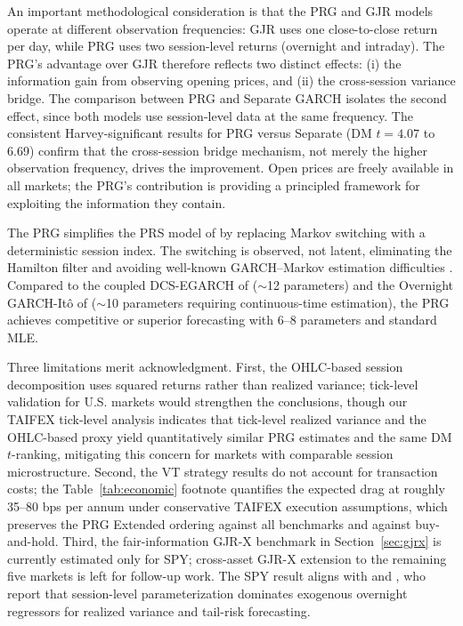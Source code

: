 \documentclass[11pt,a4paper]{article}
\begin{document}
An important methodological consideration is that the PRG and GJR models operate at different observation frequencies: GJR uses one close-to-close return per day, while PRG uses two session-level returns (overnight and intraday). The PRG's advantage over GJR therefore reflects two distinct effects: (i) the information gain from observing opening prices, and (ii) the cross-session variance bridge. The comparison between PRG and Separate GARCH isolates the second effect, since both models use session-level data at the same frequency. The consistent Harvey-significant results for PRG versus Separate (DM $t = 4.07$ to 6.69) confirm that the cross-session bridge mechanism, not merely the higher observation frequency, drives the improvement. Open prices are freely available in all markets; the PRG's contribution is providing a principled framework for exploiting the information they contain.

The PRG simplifies the PRS model of \citet{Lai2024} by replacing Markov switching with a deterministic session index. The switching is observed, not latent, eliminating the Hamilton filter and avoiding well-known GARCH--Markov estimation difficulties \citep{Haas2004}. Compared to the coupled DCS-EGARCH of \citet{Linton2020} ($\sim$12 parameters) and the Overnight GARCH-It\^{o} of \citet{Kim2023} ($\sim$10 parameters requiring continuous-time estimation), the PRG achieves competitive or superior forecasting with 6--8 parameters and standard MLE.

Three limitations merit acknowledgment. First, the OHLC-based session decomposition uses squared returns rather than realized variance; tick-level validation for U.S. markets would strengthen the conclusions, though our TAIFEX tick-level analysis indicates that tick-level realized variance and the OHLC-based proxy yield quantitatively similar PRG estimates and the same DM $t$-ranking, mitigating this concern for markets with comparable session microstructure. Second, the VT strategy results do not account for transaction costs; the Table~\ref{tab:economic} footnote quantifies the expected drag at roughly 35--80 bps per annum under conservative TAIFEX execution assumptions, which preserves the PRG Extended ordering against all benchmarks and against buy-and-hold. Third, the fair-information GJR-X benchmark in Section~\ref{sec:gjrx} is currently estimated only for SPY; cross-asset GJR-X extension to the remaining five markets is left for follow-up work. The SPY result aligns with \citet{Todorova2014} and \citet{Opschoor2021}, who report that session-level parameterization dominates exogenous overnight regressors for realized variance and tail-risk forecasting.
\end{document}

